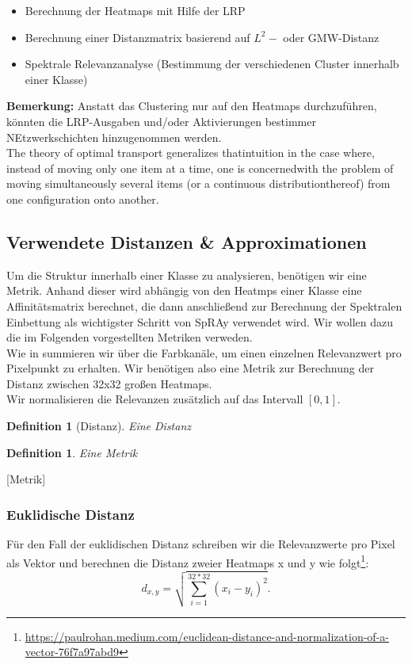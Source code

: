 \documentclass[twoside, 12pt,a4paper]{article}
\def\emph#1{\textit{#1}}
\newtheorem{definition}[theorem]{Definition}
\numberwithin{equation}{section}
\begin{document}
	\begin{itemize}
		\item Berechnung der Heatmaps mit Hilfe der LRP
		\item Berechnung einer Distanzmatrix basierend auf $L^2-$ oder GMW-Distanz
		\item Spektrale Relevanzanalyse (Bestimmung der verschiedenen Cluster innerhalb einer Klasse)
	\end{itemize}

	\noindent  \textbf{Bemerkung:} Anstatt das Clustering nur auf den Heatmaps durchzuführen, könnten die LRP-Ausgaben und/oder Aktivierungen bestimmer NEtzwerkschichten hinzugenommen werden.\\
	
	The theory of optimal transport generalizes thatintuition in the case where, instead of moving only one item at a time, one is concernedwith the problem of moving simultaneously several items (or a continuous distributionthereof) from one configuration onto another.\cite{computationalOT}
	\subsection{Verwendete Distanzen \& Approximationen}
	
	Um die Struktur innerhalb einer Klasse zu analysieren, benötigen wir eine Metrik.
	Anhand dieser wird abhängig von den Heatmps einer Klasse eine Affinitätsmatrix berechnet, die dann anschließend zur Berechnung der Spektralen Einbettung als wichtigster Schritt von SpRAy verwendet wird. Wir wollen dazu die im Folgenden vorgestellten Metriken verweden.\\
	Wie in \cite{imagenet_unhansed_v1} summieren wir über die Farbkanäle, um einen einzelnen Relevanzwert pro Pixelpunkt zu erhalten. Wir benötigen also eine Metrik zur Berechnung der Distanz zwischen 32x32 großen Heatmaps.\\
	Wir normalisieren die Relevanzen zusätzlich auf das Intervall $[0,1]$.
	
	\begin{definition}[Distanz]
		Eine \emph{Distanz}
	\end{definition}
	\begin{definition}
		Eine \emph{Metrik}
	\end{definition}[Metrik]

	
	
	\subsubsection{Euklidische Distanz} \label{l2dist}
	Für den Fall der euklidischen Distanz schreiben wir die Relevanzwerte pro Pixel als Vektor und berechnen die Distanz zweier Heatmaps x und y wie folgt\footnote{\url{https://paulrohan.medium.com/euclidean-distance-and-normalization-of-a-vector-76f7a97abd9}}:
	$$ d_{x,y} = \sqrt{\sum_{i=1}^{32 * 32}{(x_i -y_i)^2}}.$$
	
\end{document}
